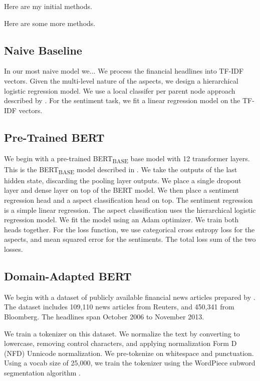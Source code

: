 Here are my initial methods.



Here are some more methods.



\subsection{Naive Baseline}

In our most naive model we...
We process the financial headlines into TF-IDF vectors.
Given the multi-level nature of the aspects, we design a hierarchical logistic regression model.
We use a local classifer per parent node approach described by \cite{Silla:2011tp}.
For the sentiment task, we fit a linear regression model on the TF-IDF vectors.


\subsection{Pre-Trained BERT}

We begin with a pre-trained BERT\textsubscript{BASE} base model with 12 transformer layers.
This is the BERT\textsubscript{BASE} model described in \cite{DBLP:journals/corr/abs-1810-04805}.
We take the outputs of the last hidden state, discarding the pooling layer outputs.
We place a single dropout layer and dense layer on top of the BERT model.
We then place a sentiment regression head and a aspect classification head on top.
The sentiment regression is a simple linear regression.
The aspect classification uses the hierarchical logistic regression model.
We fit the model using an Adam optimizer.
We train both heads together.
For the loss function, we use categorical cross entropy loss for the aspects, and mean squared error for the sentiments.
The total loss sum of the two losses.

\subsection{Domain-Adapted BERT}


We begin with a dataset of publicly available financial news articles prepared by \cite{ding2014using}.
The dataset includes 109,110 news articles from Reuters, and 450,341 from Bloomberg.
The headlines span October 2006 to November 2013.


We train a tokenizer on this dataset.
We normalize the text by converting to lowercase, removing control characters, and applying normalization Form D (NFD) Unnicode normalization.
We pre-tokenize on whitespace and punctuation.
Using a vocab size of 25,000, we train the tokenizer using the WordPiece subword segmentation algorithm \cite{DBLP:journals/corr/WuSCLNMKCGMKSJL16}.


